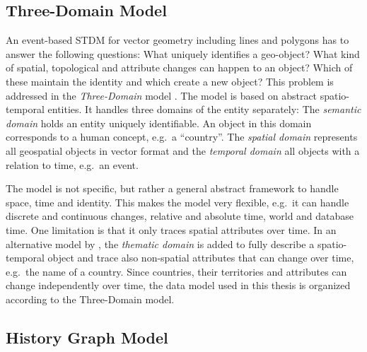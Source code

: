 

\newpage
\subsection{Three-Domain Model} %
\label{sub:three_domain_model}

An event-based STDM for vector geometry including lines and polygons has to answer the following questions: What uniquely identifies a geo-object? What kind of spatial, topological and attribute changes can happen to an object? Which of these maintain the identity and which create a new object? This problem is addressed in the \emph{Three-Domain} model \cite{yuan96threedomain, yuan96temporal}. The model is based on abstract spatio-temporal entities. It handles three domains of the entity separately:
The \emph{semantic domain} holds an entity uniquely identifiable. An object in this domain corresponds to a human concept, e.g.\ a ``country''.
The \emph{spatial domain} represents all geospatial objects in vector format and the \emph{temporal domain} all objects with a relation to time, e.g.\ an event.

The model is not specific, but rather a general abstract framework to handle space, time and identity. This makes the model very flexible, e.g.\ it can handle discrete and continuous changes, relative and absolute time, world and database time. One limitation is that it only traces spatial attributes over time. In an alternative model by \cite{claramunt95timeingis}, the \emph{thematic domain} is added to fully describe a spatio-temporal object and trace also non-spatial attributes that can change over time, e.g.\ the name of a country. Since countries, their territories and attributes can change independently over time, the data model used in this thesis is organized according to the Three-Domain model.


\subsection{History Graph Model} %
\label{sub:history_graph_model}

